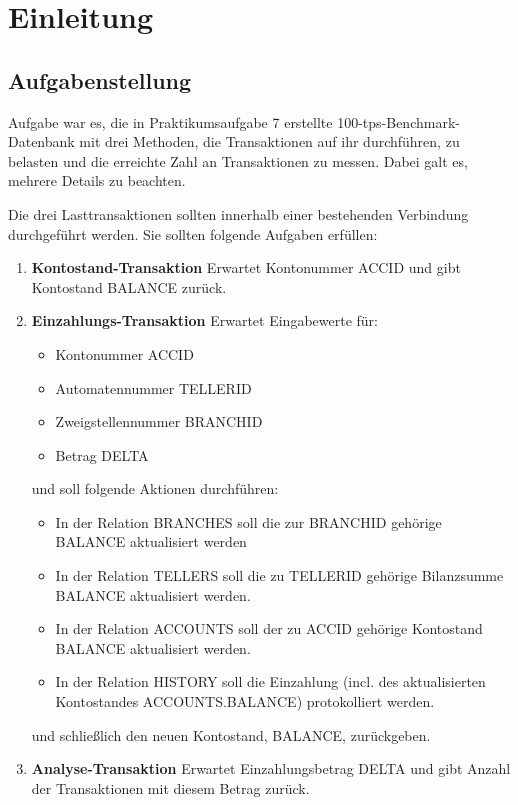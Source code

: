 \documentclass[a4paper, bibliography=totoc, 12pt]{scrartcl}
\begin{document}
	\setcounter{tocdepth}{3}%
\tableofcontents \thispagestyle{empty}

\newpage
\setcounter{page}{1}
\section{Einleitung}
\subsection{Aufgabenstellung}%
Aufgabe war es, die in Praktikumsaufgabe 7 erstellte 100-tps-Benchmark-Datenbank mit drei Methoden, die Transaktionen auf ihr durchführen, zu belasten und die erreichte Zahl an Transaktionen zu messen. Dabei galt es, mehrere Details zu beachten.

\noindent
Die drei Lasttransaktionen sollten innerhalb einer bestehenden Verbindung durchgeführt werden. Sie sollten folgende Aufgaben erfüllen:
\begin{enumerate}
\itemsep0pt
\item \textbf{Kontostand-Transaktion}
Erwartet Kontonummer ACCID und gibt Kontostand BALANCE zurück.
\item \textbf{Einzahlungs-Transaktion}
Erwartet Eingabewerte für:
	\begin{itemize}
	\itemsep0pt
	\item Kontonummer ACCID
	\item Automatennummer TELLERID
	\item Zweigstellennummer BRANCHID
	\item Betrag DELTA
	\end{itemize}
\noindent	
und soll folgende Aktionen durchführen:
	\begin{itemize}
	\item In der Relation BRANCHES soll die zur BRANCHID gehörige BALANCE aktualisiert werden
	\item In der Relation TELLERS soll die zu TELLERID gehörige Bilanzsumme BALANCE
aktualisiert werden.
	\item In der Relation ACCOUNTS soll der zu ACCID gehörige Kontostand BALANCE
aktualisiert werden.
	\item In der Relation HISTORY soll die Einzahlung (incl. des aktualisierten Kontostandes
ACCOUNTS.BALANCE) protokolliert werden.
	\end{itemize}
und schließlich den neuen Kontostand, BALANCE, zurückgeben.
\item \textbf{Analyse-Transaktion}
Erwartet Einzahlungsbetrag DELTA und gibt Anzahl der Transaktionen mit diesem Betrag zurück.
\end{enumerate}
\end{document}
